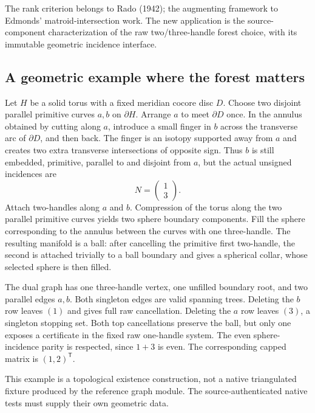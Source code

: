 The rank criterion belongs to Rado (1942); the augmenting framework to
Edmonds' matroid-intersection work.  The new application is the
source-component characterization of the raw two/three-handle forest
choice, with its immutable geometric incidence interface.

\subsection{A geometric example where the forest matters}

\begin{example}
\label{ex:geometric-forest-choice}
Let $H$ be a solid torus with a fixed meridian cocore disc $D$.  Choose
two disjoint parallel primitive curves $a,b$ on $\partial H$.  Arrange
$a$ to meet $\partial D$ once.  In the annulus obtained by cutting along
$a$, introduce a small finger in $b$ across the transverse arc of
$\partial D$, and then back.  The finger is an isotopy supported away
from $a$ and creates two extra transverse intersections of opposite
sign.  Thus $b$ is still embedded, primitive, parallel to and disjoint
from $a$, but the actual unsigned incidences are
\[
                              N=\begin{pmatrix}1\\3\end{pmatrix}.
\]
Attach two-handles along $a$ and $b$.  Compression of the torus along
the two parallel primitive curves yields two sphere boundary components.
Fill the sphere corresponding to the annulus between the curves with
one three-handle.  The resulting manifold is a ball: after cancelling
the primitive first two-handle, the second is attached trivially to a
ball boundary and gives a spherical collar, whose selected sphere is
then filled.

The dual graph has one three-handle vertex, one unfilled boundary root,
and two parallel edges $a,b$.  Both singleton edges are valid spanning
trees.  Deleting the $b$ row leaves $(1)$ and gives full raw cancellation.
Deleting the $a$ row leaves $(3)$, a singleton stopping set.  Both top
cancellations preserve the ball, but only one exposes a certificate in
the fixed raw one-handle system.  The even sphere-incidence parity is
respected, since $1+3$ is even.  The corresponding capped matrix is
$(1,2)^{\mathsf T}$.
\end{example}

This example is a topological existence construction, not a native
triangulated fixture produced by the reference graph module.  The
source-authenticated native tests must supply their own geometric data.

